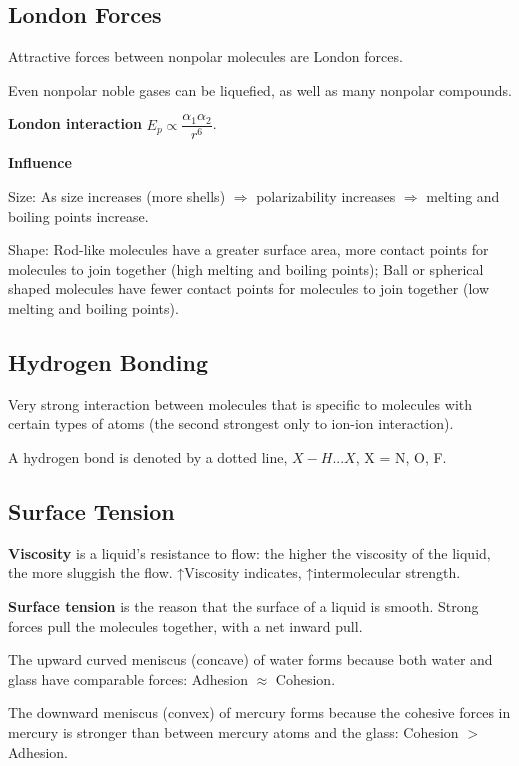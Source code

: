 \documentclass[a4paper,12pt]{article}
\begin{document}
\subsection{London Forces}
Attractive forces between nonpolar molecules are London forces.\par
Even nonpolar noble gases can be liquefied, as well as many nonpolar compounds.\par
\textbf{London interaction} $E_{p} \propto \dfrac{\alpha_{1}\alpha_{2}}{r^{6}}$.\par
\textbf{Influence}\par
Size: As size increases (more shells) $\Rightarrow$ polarizability increases $\Rightarrow$ melting and boiling points increase.\par
Shape: Rod-like molecules have a greater surface area, more contact points for molecules to join together (high melting and boiling points); Ball or spherical shaped molecules have fewer contact points for molecules to join together (low melting and boiling points).
\subsection{Hydrogen Bonding}
Very strong interaction between molecules that is specific to molecules with certain types of atoms (the second strongest only to ion-ion interaction).\par
A hydrogen bond is denoted by a dotted line, $X-H...X$, X = N, O, F.
\subsection{Surface Tension}
\textbf{Viscosity} is a liquid’s resistance to flow: the higher the viscosity of the liquid,
the more sluggish the flow. ↑Viscosity indicates, ↑intermolecular strength.\par
\textbf{Surface tension} is the reason that the surface of a liquid is smooth. Strong forces pull the molecules together, with a net inward pull.\par
The upward curved meniscus (concave) of water forms because both water and glass have comparable forces: Adhesion $\approx$ Cohesion.\par
The downward meniscus (convex) of mercury forms because the cohesive forces in mercury is stronger than between mercury atoms and the glass: Cohesion $>$ Adhesion.
\end{document}
